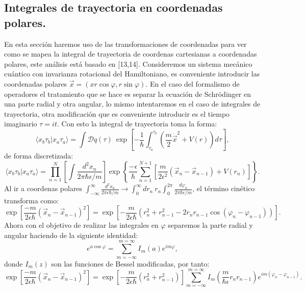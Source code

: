 \subsection{Integrales de trayectoria en coordenadas polares.}
En esta sección haremos uso de las transformaciones de coordenadas para ver como se mapea la integral de trayectoria de coordenas cartesianas a coordenadas polares, este análisis está basado en [13,14]. Consideremos un sistema mecánico cuántico con invarianza rotacional del Hamiltoniano, es conveniente introducir las coordenadas polares $\vec{x}=(x r\cos \varphi,r\sin \varphi)$. En el caso del formalismo de operadores el tratamiento que se hace es separar la ecuación de Schrödinger en una parte radial y otra angular, lo mismo intentaremos en el caso de integrales de trayectoria, otra modificación que es conveniente introducir es el tiempo imaginario $\tau=it$. Con esto la integral de trayectoria toma la forma:
\begin{equation}
\langle x_{b}\tau_{b}|x_{a}\tau_{a}\rangle=\int\mathcal{D}q(\tau)\ \exp\left[-\frac{1}{\hbar}\int_{\tau_{a}}^{\tau_{b}}\left(\frac{m}{2}\dot{\vec{x}}^{2}+V(r)\right)d\tau\right],
\end{equation}
de forma discretizada:
\begin{equation}
\langle x_{b}\tau_{b}|x_{a}\tau_{a}\rangle=\prod_{n=1}^{N}\left[\int\frac{d^{2}x_{n}}{2\pi\hbar\epsilon/m}\right]\exp\left\{ \frac{-\epsilon}{\hbar}\sum_{n=1}^{N+1}\left[\frac{m}{2\epsilon^{2}}(\vec{x}_{n}-\vec{x}_{n-1})+V(r_{n})\right]\right\} .
\end{equation}
Al ir a coordenas polares $\int_{-\infty}^{\infty}\frac{d^{2}x_{n}}{2\pi\epsilon\hbar/m}\to\int_{0}^{\infty}dr_{n}\ r_{n}\int_{0}^{2\pi}\frac{d\varphi_{n}}{2\pi\hbar\epsilon/m}$, el término cinético transforma como:
\begin{equation}
\exp\left[\frac{-m}{2\epsilon\hbar}(\vec{x}_{n}-\vec{x}_{n-1})^{2}\right]=\exp\left[-\frac{m}{2\epsilon\hbar}(r_{n}^{2}+r_{n-1}^{2}-2r_{n}r_{n-1}\cos(\varphi_{n}-\varphi_{n-1}))\right] .
\end{equation}
Ahora con el objetivo de realizar las integrales en $\varphi$ separemos la parte radial y angular haciendo de la siguiente identidad:
\begin{equation}
e^{a\cos\varphi}=\sum_{m=-\infty}^{m=\infty}I_{m}(a)e^{im\varphi},
\end{equation}
donde $I_m(z)$ son las funciones de Bessel modificadas, por tanto:
\begin{equation}
\exp\left[\frac{-m}{2\epsilon\hbar}(\vec{x}_{n}-\vec{x}_{n-1})^{2}\right]=\exp\left[-\frac{m}{2\epsilon\hbar}(r_{n}^{2}+r_{n-1}^{2})\right]\sum_{m=-\infty}^{m=\infty}I_{m}\left(\frac{m}{\hbar\epsilon}r_{n}r_{n-1}\right)e^{im(\varphi_{n}-\varphi_{n-1})} .
\end{equation}
